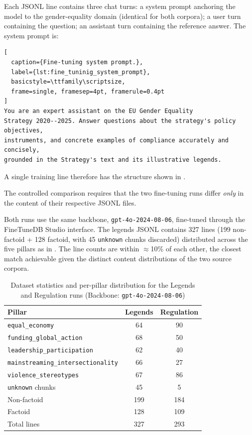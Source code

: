 \documentclass[pdflatex, sn-apa]{sn-jnl}%
\theoremstyle{thmstyleone}%
\theoremstyle{thmstyletwo}%
\theoremstyle{thmstylethree}%
\begin{document}
Each JSONL line contains three chat turns: a system prompt anchoring the model to
the gender-equality domain (identical for both corpora); a user turn containing
the question; an assistant turn containing the reference answer. The system
prompt is:

\begin{lstlisting}[
  caption={Fine-tuning system prompt.},
  label={lst:fine_tuninig_system_prompt},
  basicstyle=\ttfamily\scriptsize,
  frame=single, framesep=4pt, framerule=0.4pt
]
You are an expert assistant on the EU Gender Equality
Strategy 2020--2025. Answer questions about the strategy's policy objectives,
instruments, and concrete examples of compliance accurately and concisely,
grounded in the Strategy's text and its illustrative legends.
\end{lstlisting}


A single training line therefore has the structure shown in
.

The controlled comparison requires that the two fine-tuning runs differ
\emph{only} in the content of their respective JSONL files.

Both runs use the same backbone, \texttt{gpt-4o-2024-08-06}, fine-tuned through
the FineTuneDB Studio interface. The legends JSONL contains 327 lines (199
non-factoid + 128 factoid, with 45 \texttt{unknown} chunks discarded) distributed
across the five pillars as in . The line counts are within
$\approx$10\% of each other, the closest match achievable given the distinct
content distributions of the two source corpora.


\begin{table}[htbp]
\centering
\caption{Dataset statistics and per-pillar distribution for the Legends and
Regulation runs (Backbone: \texttt{gpt-4o-2024-08-06})}
\label{tab:dataset_stats}
\begin{tabular}{@{}lcc@{}}
\toprule
\textbf{Pillar} & \textbf{Legends} & \textbf{Regulation} \\ \midrule
\texttt{equal\_economy} & 64 & 90 \\
\texttt{funding\_global\_action} & 68 & 50 \\
\texttt{leadership\_participation} & 62 & 40 \\
\texttt{mainstreaming\_intersectionality} & 66 & 27 \\
\texttt{violence\_stereotypes} & 67 & 86 \\ 
\texttt{unknown} chunks & 45 & 5 \\ \midrule
Non-factoid & 199 & 184 \\
Factoid & 128 & 109 \\ 
Total lines & 327 & 293 \\ \bottomrule
\end{tabular}
\end{table}
\end{document}
